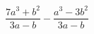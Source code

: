 \begin{ex}
	\begin{condition}
		\( \dfrac{7a^3+b^2}{3a-b}-\dfrac{a^3-3b^2}{3a-b} \)
	\end{condition}
\end{ex}